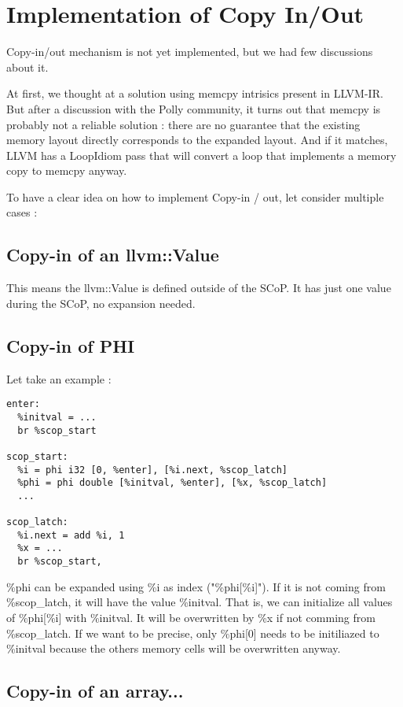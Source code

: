 \chapter{Implementation of Copy In/Out}\label{ch:CopyInOut}

Copy-in/out mechanism is not yet implemented, but we had few discussions about it. 

At first, we thought at a solution using memcpy intrisics present in LLVM-IR. But after a discussion with the Polly community, it turns out that memcpy is probably not a reliable solution : there are no guarantee that the existing memory layout directly corresponds to the expanded layout. And if it matches, LLVM has a LoopIdiom pass that will convert a loop that implements a memory copy to memcpy anyway.

To have a clear idea on how to implement Copy-in / out, let consider multiple cases :

\section{Copy-in of an llvm::Value}
This means the llvm::Value is defined outside of the SCoP. It has just one value during the SCoP, no expansion needed.

\section{Copy-in of PHI}
Let take an example :
\begin{lstlisting}[frame=single]
enter:
  %initval = ...
  br %scop_start

scop_start:
  %i = phi i32 [0, %enter], [%i.next, %scop_latch]
  %phi = phi double [%initval, %enter], [%x, %scop_latch]
  ...

scop_latch:
  %i.next = add %i, 1
  %x = ...
  br %scop_start,
\end{lstlisting}

\%phi can be expanded using \%i as index ("\%phi[\%i]"). If it is not coming from \%scop\_latch, it will have the value \%initval. That is, we can initialize all values of \%phi[\%i] with \%initval. It will be overwritten by \%x if not comming from \%scop\_latch. If we want to be precise, only \%phi[0] needs to be initiliazed to \%initval because the others memory cells will be overwritten anyway.

\section{Copy-in of an array...}

